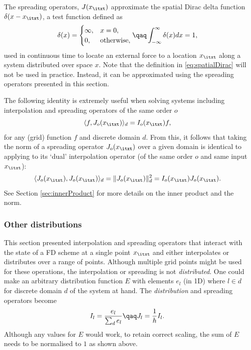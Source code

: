 The spreading operators, $J(x_\itxt)$ approximate the spatial Dirac delta function $\delta(x-x_\itxt)$, a test function defined as
\begin{equation}\label{eq:spatialDirac}
    \delta(x)= \begin{cases}
        \infty, & x = 0,\\
        0, & \text{otherwise},
    \end{cases} \qaq \int_{-\infty}^{\infty} \delta(x)dx = 1,
\end{equation}
used in continuous time to locate an external force to a location $x_\itxt$ along a system distributed over space $x$. Note that the definition in \eqref{eq:spatialDirac} will not be used in practice. Instead, it can be approximated using the spreading operators presented in this section. 

The following identity is extremely useful when solving systems including interpolation and spreading operators of the same order $o$
\begin{equation}\label{eq:identityIJ}
    \langle f, J_o(x_\itxt) \rangle_d = I_o(x_\itxt) f,
\end{equation}
for any (grid) function $f$ and discrete domain $d$. From this, it follows that taking the norm of a spreading operator $J_o(x_\itxt)$ over a given domain is identical to applying to its `dual' interpolation operator (of the same order $o$ and same input $x_\itxt$):
\begin{equation}
    \langle  J_o(x_\itxt), J_o(x_\itxt)\rangle_d = \lVert J_o(x_\itxt)\rVert^2_d = I_o(x_\itxt)J_o(x_\itxt).
\end{equation}
See Section \ref{sec:innerProduct} for more details on the inner product and the norm.

\subsubsection{Other distributions}
This section presented interpolation and spreading operators that interact with the state of a FD scheme at a single point $x_\itxt$ and either interpolates or distributes over a range of points. Although multiple grid points might be used for these operations, the interpolation or spreading is not \textit{distributed}. One could make an arbitrary distribution function $E$ with elements $e_l$ (in 1D) where $l\in d$ for discrete domain $d$ of the system at hand. The \textit{distribution} and spreading operators become
\begin{equation}
    I_l = \frac{e_l}{\sum_d e_l} \qaq J_l = \frac{1}{h}I_l.
\end{equation}
Although any values for $E$ would work, to retain correct scaling, the sum of $E$ needs to be normalised to $1$ as shown above.

